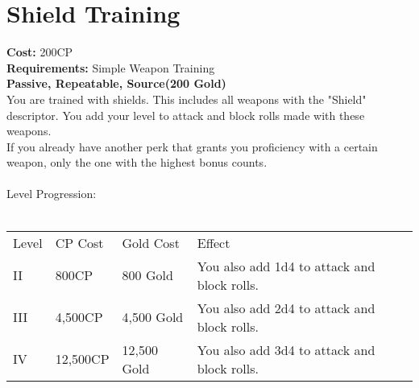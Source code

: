 \section{Shield Training}\label{perk:shieldTraining}
\textbf{Cost:} 200CP\\
\textbf{Requirements:} Simple Weapon Training\\
\textbf{Passive, Repeatable, Source(200 Gold)}\\
You are trained with shields.
This includes all weapons with the "Shield" descriptor.
You add your level to attack and block rolls made with these weapons.\\
If you already have another perk that grants you proficiency with a certain weapon, only the one with the highest bonus counts.\\
\\
Level Progression:\\
\\
\begin{tabular}{l | l | l | l}
	Level & CP Cost & Gold Cost & Effect\\
	II & 800CP & 800 Gold & You also add 1d4 to attack and block rolls.\\
	III & 4,500CP & 4,500 Gold & You also add 2d4 to attack and block rolls.\\
	IV & 12,500CP & 12,500 Gold & You also add 3d4 to attack and block rolls.\\
\end{tabular}